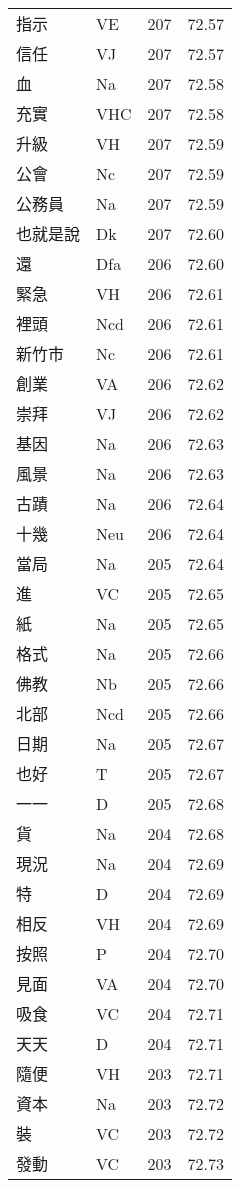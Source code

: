 \documentclass[twocolumn]{book}
\begin{document}
\begin{supertabular}{llrr}
指示 & VE & 207 &  72.57\\
信任 & VJ & 207 &  72.57\\
血 & Na & 207 &  72.58\\
充實 & VHC & 207 &  72.58\\
升級 & VH & 207 &  72.59\\
公會 & Nc & 207 &  72.59\\
公務員 & Na & 207 &  72.59\\
也就是說 & Dk & 207 &  72.60\\
還 & Dfa & 206 &  72.60\\
緊急 & VH & 206 &  72.61\\
裡頭 & Ncd & 206 &  72.61\\
新竹市 & Nc & 206 &  72.61\\
創業 & VA & 206 &  72.62\\
崇拜 & VJ & 206 &  72.62\\
基因 & Na & 206 &  72.63\\
風景 & Na & 206 &  72.63\\
古蹟 & Na & 206 &  72.64\\
十幾 & Neu & 206 &  72.64\\
當局 & Na & 205 &  72.64\\
進 & VC & 205 &  72.65\\
紙 & Na & 205 &  72.65\\
格式 & Na & 205 &  72.66\\
佛教 & Nb & 205 &  72.66\\
北部 & Ncd & 205 &  72.66\\
日期 & Na & 205 &  72.67\\
也好 & T & 205 &  72.67\\
一一 & D & 205 &  72.68\\
貨 & Na & 204 &  72.68\\
現況 & Na & 204 &  72.69\\
特 & D & 204 &  72.69\\
相反 & VH & 204 &  72.69\\
按照 & P & 204 &  72.70\\
見面 & VA & 204 &  72.70\\
吸食 & VC & 204 &  72.71\\
天天 & D & 204 &  72.71\\
隨便 & VH & 203 &  72.71\\
資本 & Na & 203 &  72.72\\
裝 & VC & 203 &  72.72\\
發動 & VC & 203 &  72.73\\

\end{supertabular}
\end{document}

